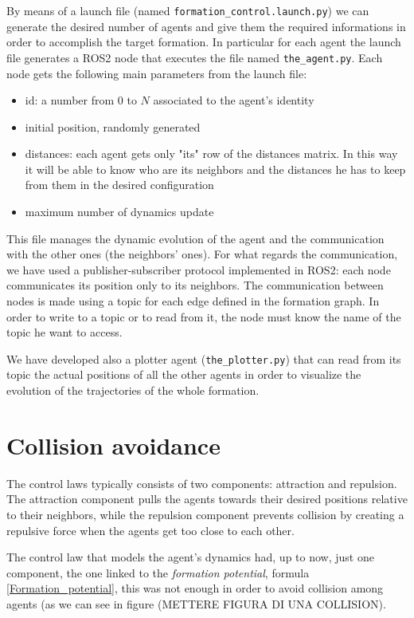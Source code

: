 \documentclass[a4paper,11pt,oneside]{book}
\begin{document}
\bigskip
By means of a launch file (named \texttt{formation\_control.launch.py}) we can generate the desired number of agents and give them the required informations in order to accomplish the target formation. In particular for each agent the launch file generates a ROS2 node that executes the file named \texttt{the\_agent.py}. Each node gets the following main parameters from the launch file:
\begin{itemize}
\item id: a number from $0$ to $N$ associated to the agent's identity
\item initial position, randomly generated
\item distances: each agent gets only "its" row of the distances matrix. In this way it will be able to know who are its neighbors and the distances he has to keep from them in the desired configuration
\item maximum number of dynamics update
\end{itemize}
This file manages the dynamic evolution of the agent and the communication with the other ones (the neighbors' ones). For what regards the communication, we have used a publisher-subscriber protocol implemented in ROS2: each node communicates its position only to its neighbors. The communication between nodes is made using a topic for each edge defined in the formation graph. In order to write to a topic or to read from it, the node must know the name of the topic he want to access.

\bigskip
We have developed also a plotter agent (\texttt{the\_plotter.py}) that can read from its topic the actual positions of all the other agents in order to visualize the evolution of the trajectories of the whole formation.

\section{Collision avoidance}
The control laws typically consists of two components: attraction and repulsion. The attraction component pulls the agents towards their desired positions relative to their neighbors, while the repulsion component prevents collision by creating a repulsive force when the agents get too close to each other.

The control law that models the agent's dynamics had, up to now, just one component, the one linked to the \textit{formation potential}, formula \ref{Formation_potential}, this was not enough in order to avoid collision among agents (as we can see in figure (METTERE FIGURA DI UNA COLLISION). 
\end{document}

